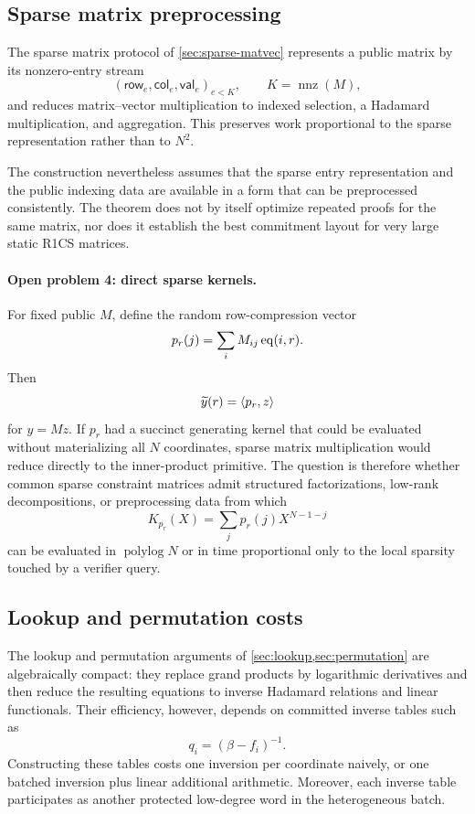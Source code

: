 \subsection{Sparse matrix preprocessing}
\label{sec:limitations-sparse-preprocessing}

The sparse matrix protocol of \cref{sec:sparse-matvec} represents a public matrix by its nonzero-entry stream
\[
  (\mathsf{row}_e,\mathsf{col}_e,\mathsf{val}_e)_{e<K},
  \qquad K=\operatorname{nnz}(M),
\]
and reduces matrix--vector multiplication to indexed selection, a Hadamard multiplication, and aggregation.  This preserves work proportional to the sparse representation rather than to $N^2$.

The construction nevertheless assumes that the sparse entry representation and the public indexing data are available in a form that can be preprocessed consistently.  The theorem does not by itself optimize repeated proofs for the same matrix, nor does it establish the best commitment layout for very large static R1CS matrices.

\paragraph{Open problem 4: direct sparse kernels.}
For fixed public $M$, define the random row-compression vector
\[
  p_r(j)=\sum_i M_{ij}\operatorname{eq}(i,r).
\]
Then
\[
  \widetilde y(r)=\left\langle p_r,z\right\rangle
\]
for $y=Mz$.  If $p_r$ had a succinct generating kernel that could be evaluated without materializing all $N$ coordinates, sparse matrix multiplication would reduce directly to the inner-product primitive.  The question is therefore whether common sparse constraint matrices admit structured factorizations, low-rank decompositions, or preprocessing data from which
\[
  K_{p_r}(X)=\sum_j p_r(j)X^{N-1-j}
\]
can be evaluated in $\operatorname{polylog}N$ or in time proportional only to the local sparsity touched by a verifier query.

\subsection{Lookup and permutation costs}
\label{sec:limitations-lookup}

The lookup and permutation arguments of \cref{sec:lookup,sec:permutation} are algebraically compact: they replace grand products by logarithmic derivatives and then reduce the resulting equations to inverse Hadamard relations and linear functionals.  Their efficiency, however, depends on committed inverse tables such as
\[
  q_i=(\beta-f_i)^{-1}.
\]
Constructing these tables costs one inversion per coordinate naively, or one batched inversion plus linear additional arithmetic.  Moreover, each inverse table participates as another protected low-degree word in the heterogeneous batch.

